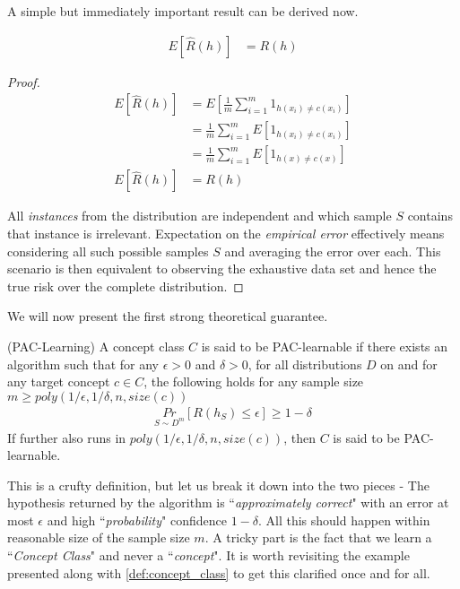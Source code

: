 \documentclass[../toml]{subfiles}
\begin{document}
A simple but immediately important result can be derived now.

\begin{theorem} \label{th:exp_emp_risk}
\begin{align}
E[\hat{R}(h)] &= R(h)
\end{align}
\end{theorem}

\begin{proof}
\begin{align}
E[\hat{R}(h)] &= E[\frac{1}{m} \sum_{i=1}^{m} 1_{h(x_i) \neq c(x_i)}] \nonumber \\
&= \frac{1}{m} \sum_{i=1}^{m} E[1_{h(x_i) \neq c(x_i)}] \tag*{(Linearity of Expectation)} \nonumber \\
&= \frac{1}{m} \sum_{i=1}^{m} E[1_{h(x) \neq c(x)}] \tag*{(x are i.i.d)} \nonumber \\
E[\hat{R}(h)] &= R(h) \nonumber
\end{align}

All \textit{instances} from the distribution are independent and which sample $S$ contains
that instance is irrelevant. Expectation on the \textit{empirical error} effectively means
considering all such possible samples $S$ and averaging the error over each. This
scenario is then equivalent to observing the exhaustive data set and hence the true risk
over the complete distribution.
\end{proof}

We will now present the first strong theoretical guarantee.

\begin{definition}(PAC-Learning) \label{def:pac_learning}
A concept class $C$ is said to be PAC-learnable if there exists an algorithm 
such that for any $\epsilon > 0$ and $\delta > 0$, for all distributions $D$ on 
and for any target concept $c \in C$, the following holds for any sample size
$m \geq poly(1/\epsilon,1/\delta,n,size(c))$
\begin{align}
\underset{S \sim D^m}{Pr}[R(h_S) \leq \epsilon] \geq 1 - \delta \label{eq:pac_learning}
\end{align}
If further  also runs in $poly(1/\epsilon,1/\delta,n,size(c))$, then $C$ is said to
be PAC-learnable.
\end{definition}

This is a crufty definition, but let us break it down into the two pieces - The hypothesis
returned by the algorithm  is ``\textit{approximately correct}" with an error at
most $\epsilon$ and high ``\textit{probability}" confidence $ 1 - \delta $. All this should
happen within reasonable size of the sample size $m$. A tricky part is the fact that we
learn a ``\textit{Concept Class}" and never a ``\textit{concept}". It is worth revisiting the
example presented along with \ref{def:concept_class} to get this clarified once and for all.
\end{document}
